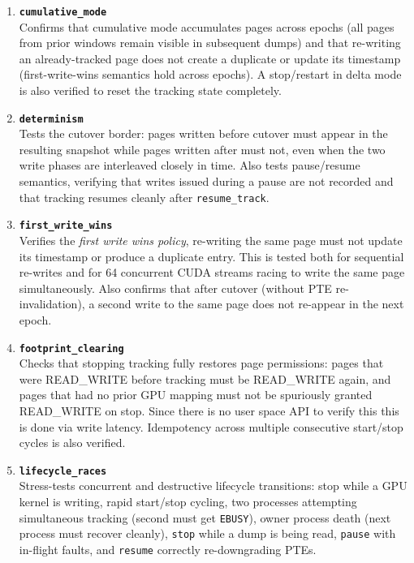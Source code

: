 \begin{enumerate}
    \item \textbf{\texttt{cumulative\_mode}}
          \\Confirms that cumulative mode accumulates pages across epochs (all pages
          from prior windows remain visible in subsequent dumps) and that
          re-writing an already-tracked page does not create a duplicate or update
          its timestamp (first-write-wins semantics hold across epochs).
          A stop/restart in delta mode is also verified to reset the tracking state
          completely.\\

    \item \textbf{\texttt{determinism}}
          \\Tests the cutover border: pages written before cutover must appear
          in the resulting snapshot while pages written after must not, even when the
          two write phases are interleaved closely in time.
          Also tests pause/resume semantics, verifying that writes issued during a
          pause are not recorded and that tracking resumes cleanly after
          \texttt{resume\_track}.\\

    \item \textbf{\texttt{first\_write\_wins}}
          \\Verifies the \textit{first write wins policy}, re-writing the same page must
          not update its timestamp or produce a duplicate entry.
          This is tested both for sequential re-writes and for 64 concurrent CUDA
          streams racing to write the same page simultaneously.
          Also confirms that after cutover (without PTE re-invalidation), a second
          write to the same page does not re-appear in the next epoch.\\

    \item \textbf{\texttt{footprint\_clearing}}
          \\Checks that stopping tracking fully restores page permissions:
          pages that were READ\_WRITE before tracking must be READ\_WRITE again,
          and pages that had no prior GPU mapping
          must not be spuriously granted READ\_WRITE on stop.
          Since there is no user space API to verify this this is done via write latency.
          Idempotency across multiple consecutive start/stop cycles is also verified.\\

    \item \textbf{\texttt{lifecycle\_races}}
          \\Stress-tests concurrent and destructive lifecycle transitions:
          stop while a GPU kernel is writing, rapid start/stop cycling,
          two processes attempting simultaneous tracking (second must get
          \texttt{EBUSY}), owner process death (next process must recover cleanly),
          \texttt{stop} while a dump is being read, \texttt{pause} with in-flight
          faults, and \texttt{resume} correctly re-downgrading PTEs.\\


\end{enumerate}
